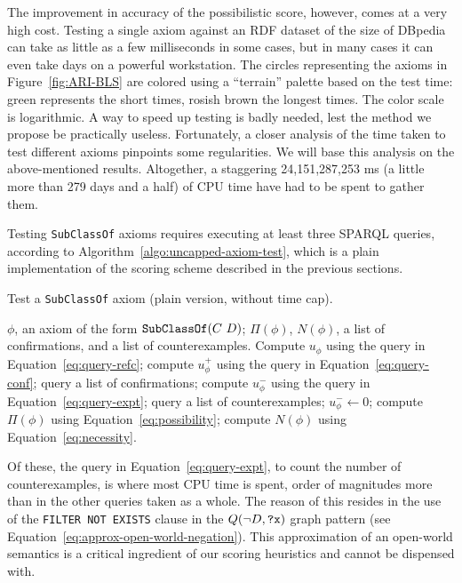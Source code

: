 \documentclass{sig-alternate}
\begin{document}
The improvement in accuracy of the possibilistic score, however, comes at a very high cost.
Testing a single axiom against an RDF dataset of the size of DBpedia can take
as little as a few milliseconds in some cases, but in many cases it can even take
days on a powerful workstation. The circles representing the axioms in Figure~\ref{fig:ARI-BLS}
are colored using a ``terrain'' palette based on the test time: green represents
the short times, rosish brown the longest times. The color scale is logarithmic.
A way to speed up testing is badly needed, lest the method we propose be practically useless.
Fortunately, a closer analysis of the time taken to test different axioms
pinpoints some regularities. We will base this analysis on the above-mentioned results.
Altogether, a staggering 24,151,287,253 ms (a little more than 279 days and a half)
of CPU time have had to be spent to gather them.

Testing \texttt{SubClassOf} axioms requires executing at least three SPARQL queries,
according to Algorithm~\ref{algo:uncapped-axiom-test}, which is a plain implementation
of the scoring scheme described in the previous sections.

\begin{algorithm}
\caption{Test a \texttt{SubClassOf} axiom\hfill\break
  (plain version, without time cap).}\label{algo:uncapped-axiom-test}
\begin{algorithmic}[1]
  \REQUIRE $\phi$, an axiom of the form $\mbox{\tt SubClassOf}(C\ D)$;
  \ENSURE $\Pi(\phi)$, $N(\phi)$, a list of confirmations, and a list of counterexamples.
  \STATE Compute $u_\phi$ using the query in Equation~\ref{eq:query-refc};
  \STATE compute $u^+_\phi$ using the query in Equation~\ref{eq:query-conf};
    \STATE query a list of confirmations;
  \ENDIF
    \STATE compute $u^-_\phi$ using the query in Equation~\ref{eq:query-expt};\label{line:count-expt}
      \STATE query a list of counterexamples;
    \ENDIF
  \ELSE
    \STATE $u^-_\phi \leftarrow 0$;
  \ENDIF
  \STATE compute $\Pi(\phi)$ using Equation~\ref{eq:possibility};
  \STATE compute $N(\phi)$ using Equation~\ref{eq:necessity}.
\end{algorithmic}
\end{algorithm}

Of these, the query in Equation~\ref{eq:query-expt}, to count the number of counterexamples,
is where most CPU time is spent, order of magnitudes more than in the other queries taken as a whole.
The reason of this resides in the use of the \texttt{FILTER NOT EXISTS} clause
in the $Q(\neg D, \mbox{\tt ?x})$ graph pattern (see Equation~\ref{eq:approx-open-world-negation}).
This approximation of an open-world semantics is a critical ingredient of our
scoring heuristics and cannot be dispensed with.
\end{document}
